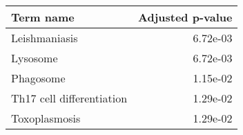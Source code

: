 \begin{tabular}{lr}
\toprule
                 Term name &  Adjusted p-value \\
\midrule
             Leishmaniasis &          6.72e-03 \\
                  Lysosome &          6.72e-03 \\
                 Phagosome &          1.15e-02 \\
 Th17 cell differentiation &          1.29e-02 \\
             Toxoplasmosis &          1.29e-02 \\
\bottomrule
\end{tabular}
